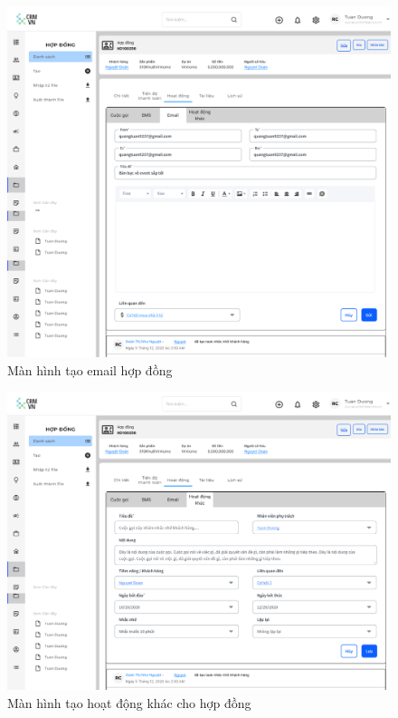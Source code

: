 \documentclass[12pt,a4paper]{article}
\begin{document}
\begin{enumerate}
\begin{itemize}
            \begin{figure}[H]
                \centering \includegraphics[width=\textwidth]{Img/Nguyet/Hopdong/email.png}
                \vspace{0.5cm}
                \caption{Màn hình tạo email hợp đồng }
                \label{emailhd}
            \end{figure}

            \begin{figure}[H]
                \centering \includegraphics[width=\textwidth]{Img/Nguyet/Hopdong/hdkhac.png}
                \vspace{0.5cm}
                \caption{Màn hình tạo hoạt động khác cho hợp đồng }
                \label{hdkhdd}
            \end{figure}


\end{itemize}
\end{enumerate}
\end{document}
